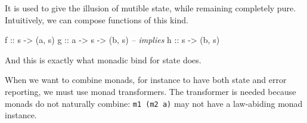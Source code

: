 \documentclass[runningheads,plain]{llncs}
\newenvironment{Shaded}{}{}
\newcommand{\KeywordTok}[1]{\textcolor[rgb]{0.00,0.44,0.13}{\textbf{#1}}}
\newcommand{\DataTypeTok}[1]{\textcolor[rgb]{0.56,0.13,0.00}{#1}}
\newcommand{\CommentTok}[1]{\textcolor[rgb]{0.38,0.63,0.69}{\textit{#1}}}
\newcommand{\OtherTok}[1]{\textcolor[rgb]{0.00,0.44,0.13}{#1}}
\newcommand{\FunctionTok}[1]{\textcolor[rgb]{0.02,0.16,0.49}{#1}}
\newcommand{\NormalTok}[1]{#1}
\begin{document}
It is used to give the illusion of mutible state, while remaining
completely pure. Intuitively, we can compose functions of this kind.

\begin{Shaded}
\begin{Highlighting}[]
\OtherTok{f ::}\NormalTok{ s }\OtherTok{->}\NormalTok{ (a,   s)}
\OtherTok{g ::}\NormalTok{       a }\OtherTok{->}\NormalTok{ s }\OtherTok{->}\NormalTok{ (b, s)}
\CommentTok{-- implies}
\OtherTok{h ::}\NormalTok{ s }\OtherTok{->}\NormalTok{            (b, s)}
\end{Highlighting}
\end{Shaded}

And this is exactly what monadic bind for state does.

\begin{Shaded}
\end{Shaded}

When we want to combine monads, for instance to have both state and
error reporting, we must use monad transformers. The transformer is
needed because monads do not naturally combine: \texttt{m1\ (m2\ a)} may
not have a law-abiding monad instance.
\end{document}
